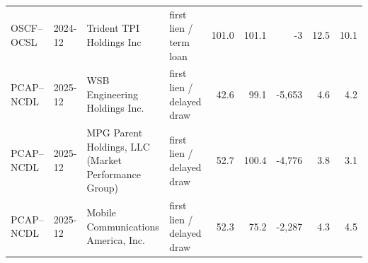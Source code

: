 \begin{longtable}{@{}ll>{\raggedright\arraybackslash}p{\dimexpr\linewidth-483.1pt\relax}>{\raggedright\arraybackslash}p{106pt}rrrrr@{}}
OSCF--OCSL & 2024-12 & Trident TPI Holdings Inc & first lien / term loan & 101.0 & 101.1 & -3 & 12.5 & 10.1 \\
PCAP--NCDL & 2025-12 & WSB Engineering Holdings Inc. & first lien / delayed draw & 42.6 & 99.1 & -5,653 & 4.6 & 4.2 \\
PCAP--NCDL & 2025-12 & MPG Parent Holdings, LLC (Market Performance Group) & first lien / delayed draw & 52.7 & 100.4 & -4,776 & 3.8 & 3.1 \\
PCAP--NCDL & 2025-12 & Mobile Communications America, Inc. & first lien / delayed draw & 52.3 & 75.2 & -2,287 & 4.3 & 4.5 \\
\end{longtable}
